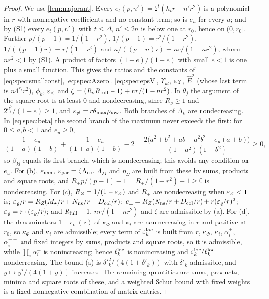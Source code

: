 \begin{proof}
We use \cref{lem:majorant}. Every $e_t(p,n')=2^t(h_tr+n'r^2)$ is a polynomial in $r$
with nonnegative coefficients and no constant term; so is $e_u$ for every $u$; and by
(S1) every $e_t(p,n')$ with $t\le\Delta$, $n'\le2n$ is below one at $r_0$, hence on
$(0,r_0]$. Further $p/(p-1)=1/(1-r^2)$, $1/(p-1)=r^2/(1-r^2)$, $1/((p-1)r)=r/(1-r^2)$
and $n/((p-n)r)=nr/(1-nr^2)$, where $nr^2<1$ by (S1). A product of factors
$(1+e)/(1-e)$ with small $e<1$ is one plus a small function. This gives the ratios and
the constants of \eqref{eq:spec:smallconst}, \eqref{eq:spec:Azero}, \eqref{eq:spec:epsV},
$\Upsilon_{kl}$, $\varepsilon_X$, $\hat E^2$ (whose last term is $n4^{r_k}r^2$), $\phi_k$, $\varepsilon_\times$ and
$\zeta=(R_\nu R_{\rm full}-1)+nr/(1-nr^2)$. In $\theta_j$ the argument of the square root
is at least $0$ and nondecreasing, since $R_\nu\ge1$ and $2^{d^0_j}/(1-e)\ge1$, and
$\varepsilon_{\ne}=r\theta_{\max}\rho_{\rm row}$. Both branches of $\Delta_k$ are nondecreasing.
In \eqref{eq:spec:beta} the second branch of the maximum never exceeds the first:
for $0\le a,b<1$ and $e_u\ge0$,
\[
  \frac{1+e_u}{(1-a)(1-b)}+\frac{1-e_u}{(1+a)(1+b)}-2
  =\frac{2\big(a^2+b^2+ab-a^2b^2+e_u(a+b)\big)}{(1-a^2)(1-b^2)}\ge0,
\]
so $\beta_{kl}$ equals its first branch, which is nondecreasing; this avoids any
condition on $e_u$. For (b), $\varepsilon_{\rm rem}$, $\varepsilon_{\rm par}=\bar\zeta\Lambda_{\rm nc}$, $\Lambda_M$ and
$\eta_B$ are built from these by sums, products and square roots, and
$R_+p/(p-1)-1=R_+/(1-r^2)-1\ge0$ is nondecreasing. For (c),
$R_Z=1/(1-\varepsilon_Z)$ and $R_+$ are nondecreasing when $\varepsilon_Z<1$ is;
$\varepsilon_\varrho/r=R_Z(M_\star/r+N_{\rm ns}/r+D_{\rm col}/r)$;
$c_\perp=R_Z(N_{\rm ns}/r+D_{\rm col}/r)+r(\varepsilon_\varrho/r)^2$; $\varepsilon_\varrho=r\cdot(\varepsilon_\varrho/r)$; and
$R_{\rm full}-1$, $nr/(1-nr^2)$ and $\zeta$ are admissible by (a). For (d), the denominators
$1-\epsilon^-_t(z)$ of $\kappa_\Phi$ and $\kappa_i$ are nonincreasing in $r$ and positive at
$r_0$, so $\kappa_\Phi$ and $\kappa_i$ are admissible; every term of
$\varepsilon^{\rm loc}_k$ is built from $r$, $\kappa_\Phi$, $\kappa_i$, $\alpha^+_i$, $\alpha^{++}_i$ and
fixed integers by sums, products and square roots, so it is admissible, while
$\prod_i\alpha^-_i$ is nonincreasing; hence $\ell^{\rm loc}_k$ is nonincreasing and
$\varepsilon^{\rm loc}_k/\ell^{\rm loc}_k$ nondecreasing. The bound (a) is
$\delta'^2_k/(4(1+\delta'_k))$ with $\delta'_k$ admissible, and $y\mapsto y^2/(4(1+y))$
increases. The remaining quantities are sums, products, minima and square roots of
these, and a weighted Schur bound with fixed weights is a fixed nonnegative
combination of matrix entries.
\end{proof}

